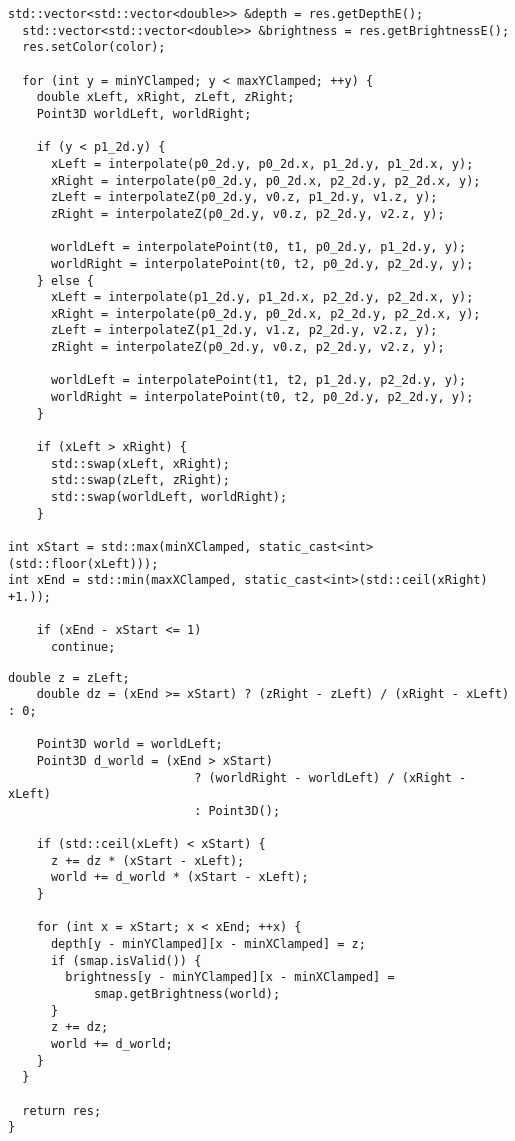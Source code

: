 \begin{lstlisting}[caption={Продолжение Растеризация треугольника}, label={lst:render_triangle2}]
  std::vector<std::vector<double>> &depth = res.getDepthE();
  std::vector<std::vector<double>> &brightness = res.getBrightnessE();
  res.setColor(color);

  for (int y = minYClamped; y < maxYClamped; ++y) {
    double xLeft, xRight, zLeft, zRight;
    Point3D worldLeft, worldRight;

    if (y < p1_2d.y) {
      xLeft = interpolate(p0_2d.y, p0_2d.x, p1_2d.y, p1_2d.x, y);
      xRight = interpolate(p0_2d.y, p0_2d.x, p2_2d.y, p2_2d.x, y);
      zLeft = interpolateZ(p0_2d.y, v0.z, p1_2d.y, v1.z, y);
      zRight = interpolateZ(p0_2d.y, v0.z, p2_2d.y, v2.z, y);

      worldLeft = interpolatePoint(t0, t1, p0_2d.y, p1_2d.y, y);
      worldRight = interpolatePoint(t0, t2, p0_2d.y, p2_2d.y, y);
    } else {
      xLeft = interpolate(p1_2d.y, p1_2d.x, p2_2d.y, p2_2d.x, y);
      xRight = interpolate(p0_2d.y, p0_2d.x, p2_2d.y, p2_2d.x, y);
      zLeft = interpolateZ(p1_2d.y, v1.z, p2_2d.y, v2.z, y);
      zRight = interpolateZ(p0_2d.y, v0.z, p2_2d.y, v2.z, y);

      worldLeft = interpolatePoint(t1, t2, p1_2d.y, p2_2d.y, y);
      worldRight = interpolatePoint(t0, t2, p0_2d.y, p2_2d.y, y);
    }

    if (xLeft > xRight) {
      std::swap(xLeft, xRight);
      std::swap(zLeft, zRight);
      std::swap(worldLeft, worldRight);
    }

int xStart = std::max(minXClamped, static_cast<int>(std::floor(xLeft)));
int xEnd = std::min(maxXClamped, static_cast<int>(std::ceil(xRight) +1.));

    if (xEnd - xStart <= 1)
      continue;
\end{lstlisting}
\newpage
\begin{lstlisting}[caption={Продолжение Растеризация треугольника}, label={lst:render_triangle3}]
    double z = zLeft;
    double dz = (xEnd >= xStart) ? (zRight - zLeft) / (xRight - xLeft) : 0;

    Point3D world = worldLeft;
    Point3D d_world = (xEnd > xStart)
                          ? (worldRight - worldLeft) / (xRight - xLeft)
                          : Point3D();

    if (std::ceil(xLeft) < xStart) {
      z += dz * (xStart - xLeft);
      world += d_world * (xStart - xLeft);
    }

    for (int x = xStart; x < xEnd; ++x) {
      depth[y - minYClamped][x - minXClamped] = z;
      if (smap.isValid()) {
        brightness[y - minYClamped][x - minXClamped] =
            smap.getBrightness(world);
      }
      z += dz;
      world += d_world;
    }
  }

  return res;
}
\end{lstlisting}
\fi

